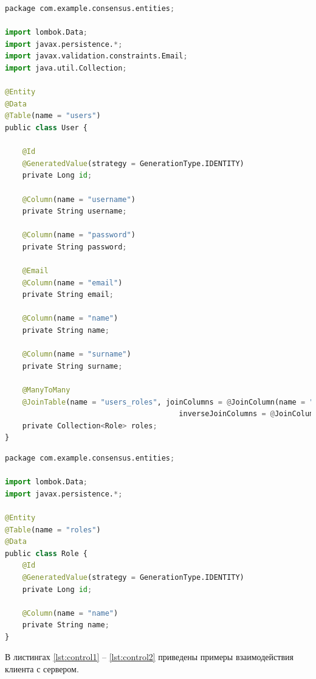 \begin{lstlisting}[label=lst:app5, caption=Сущность User, language=python]
package com.example.consensus.entities;

import lombok.Data;
import javax.persistence.*;
import javax.validation.constraints.Email;
import java.util.Collection;

@Entity
@Data
@Table(name = "users")
public class User {

	@Id
	@GeneratedValue(strategy = GenerationType.IDENTITY)
	private Long id;

	@Column(name = "username")
	private String username;

	@Column(name = "password")
	private String password;

	@Email
	@Column(name = "email")
	private String email;

	@Column(name = "name")
	private String name;

	@Column(name = "surname")
	private String surname;

	@ManyToMany
	@JoinTable(name = "users_roles", joinColumns = @JoinColumn(name = "user_id"),
										inverseJoinColumns = @JoinColumn(name = "role_id"))
	private Collection<Role> roles;
}
\end{lstlisting}


\begin{lstlisting}[label=lst:app6, caption=Сущность Role, language=python]
package com.example.consensus.entities;

import lombok.Data;
import javax.persistence.*;

@Entity
@Table(name = "roles")
@Data
public class Role {
	@Id
	@GeneratedValue(strategy = GenerationType.IDENTITY)
	private Long id;

	@Column(name = "name")
	private String name;
}	
\end{lstlisting}

В листингах \ref{lst:control1} -- \ref{lst:control2} приведены примеры взаимодействия клиента с сервером.

